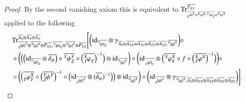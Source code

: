 \documentclass{amsart}
\def\tn{\textnormal}
\def\Trace{\tn{Tr}}
\def\ol{\overline}
\def\id{\tn{id}}
\newcommand{\feeddd}[3]{{\tensor*[^{#2}_{\color{white}{!}}]{{|#1|}}{^{#3}}}}%
\newcommand{\feeddc}[3]{{\tensor*[^{#2}]{{|#1|}}{_{#3}}}}
\newcommand{\feedcd}[3]{{\tensor*[_{#2}]{{|#1|}}{^{#3}}}}
\newcommand{\feedcc}[3]{{\tensor*[^{\color{white}{!}}_{#2}]{{|#1|}}{_{#3}}}}
\newcommand{\feedda}[3]{{\tensor*[^{#2}_{\color{white}{!}}]{{#1}}{^{#2}_{#3}}}}
\newcommand{\feedca}[3]{{\tensor*[_{#2}]{{#1}}{_{#2}^{#3}}}}
\newcommand{\feedad}[3]{{\tensor*[^{#2}_{#3}]{{#1}}{^{#2}}}}
\newcommand{\feedac}[3]{{\tensor*[_{#2}^{#3}]{{#1}}{_{#2}}}}
\theoremstyle{remark}
\theoremstyle{definition}
\begin{document}
\begin{proof}

\newpage

By the second vanishing axiom this is equivalent to $\Trace_{_{\ol{\feedcd{\psi}{Z}{Y}}\otimes\ol{\feeddd{\varphi}{X}{X}},\ol{\feeddc{\psi}{Y}{Z}}\otimes\ol{\feeddd{\varphi}{X}{X}}}}^{\ol{P_{XX}}}$ applied to the following
\begin{align*}
&\Trace^{\ol{A_0}\otimes\ol{A_X}\otimes\ol{A_Z}}_{\ol{\feedcd{\psi}{Z}{Y}}\otimes\ol{\feeddd{\varphi}{X}{X}}\otimes\ol{P_{XX}},\ol{\feeddc{\psi}{Y}{Z}}\otimes\ol{\feeddd{\varphi}{X}{X}}\otimes\ol{P_{XX}}}\Bigg[
\bigg(\id_{\ol{\feeddc{\psi}{Y}{Z}}}\otimes\gamma_{\ol{A_0}\otimes\ol{A_{XX}}\otimes\ol{A_{XZ}}\otimes\ol{A_{ZX}}\otimes\ol{A_{ZZ}},\ol{\feeddd{\varphi}{X}{X}}}\bigg)\circ\\
&\circ\bigg(\Big(\Big(\id_{\ol{\feeddc{\psi}{Y}{Z}}}\otimes\ol{\delta_\psi}\Big)\circ\ol{\feedda{\psi}{Y}{Z}}\circ\Big(\ol{\feedac{\varphi}{Y}{X}}\Big)^{-1}\Big)\otimes\id_{\ol{\feeddd{\varphi}{X}{X}}}\bigg)\circ\bigg(\id_{\ol{\feedcc{\varphi}{Y}{Y}}}\otimes\Big(\ol{\feedda{\varphi}{X}{Y}}\circ f\circ\Big(\ol{\feedad{\varphi}{X}{Y}}\Big)^{-1}\Big)\bigg)\circ\\
&\circ\bigg(\Big(\ol{\feedca{\varphi}{Y}{X}}\circ\Big(\ol{\feedad{\psi}{Y}{Z}}\Big)^{-1}\circ\Big(\id_{\ol{\feedcd{\psi}{Z}{Y}}}\otimes(\ol{\delta_\psi})^{-1}\Big)\Big)\otimes\id_{\ol{\feeddd{\varphi}{X}{X}}}\bigg)\circ\bigg(\id_{\ol{\feedcd{\psi}{Z}{Y}}}\otimes\gamma_{\ol{\feeddd{\varphi}{X}{X}},\ol{A_0}\otimes\ol{A_{XX}}\otimes\ol{A_{XZ}}\otimes\ol{A_{ZX}}\otimes\ol{A_{ZZ}}}\bigg)\Bigg].
\end{align*}


\end{proof}
\end{document}
